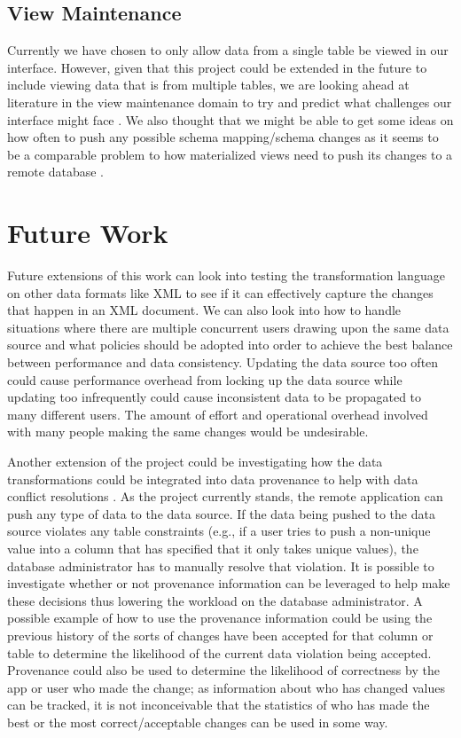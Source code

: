 \documentclass[12pt]{article}
\begin{document}
\subsection{View Maintenance}
Currently we have chosen to only allow data from a single table be viewed in our interface. However, given that this project could be extended in the future to include viewing data that is from multiple tables, we are looking ahead at literature in the view maintenance domain to try and predict what challenges our interface might face \cite{ agrawal1997efficient, agrawal2009asynchronous, gupta1999materialized, zhou2007lazy}. We also thought that we might be able to get some ideas on how often to push any possible schema mapping/schema changes as it seems to be a comparable problem to how materialized views need to push its changes to a remote database \cite{agrawal1997efficient, agrawal2009asynchronous, zhou2007lazy}. 


\section{Future Work}
Future extensions of this work can look into testing the transformation language on other data formats like XML to see if it can effectively capture the changes that happen in an XML document. We can also look into how to handle situations where there are multiple concurrent users drawing upon the same data source and what policies should be adopted into order to achieve the best balance between performance and data consistency. Updating the data source too often could cause performance overhead from locking up the data source while updating too infrequently could cause inconsistent data to be propagated to many different users. The amount of effort and operational overhead involved with many people making the same changes would be undesirable. 

Another extension of the project could be investigating how the data transformations could be integrated into data provenance to help with data conflict resolutions \cite{arniThesis}. As the project currently stands, the remote application can push any type of data to the data source. If the data being pushed to the data source violates any table constraints (e.g., if a user tries to push a non-unique value into a column that has specified that it only takes unique values), the database administrator has to manually resolve that violation. It is possible to investigate whether or not provenance information can be leveraged to help make these decisions thus lowering the workload on the database administrator. A possible example of how to use the provenance information could be using the previous history of the sorts of changes have been accepted for that column or table to determine the likelihood of the current data violation being accepted. Provenance could also be used to determine the likelihood of correctness by the app or user who made the change; as information about who has changed values can be tracked, it is not inconceivable that the statistics of who has made the best or the most correct/acceptable changes can be used in some way.
\end{document}
